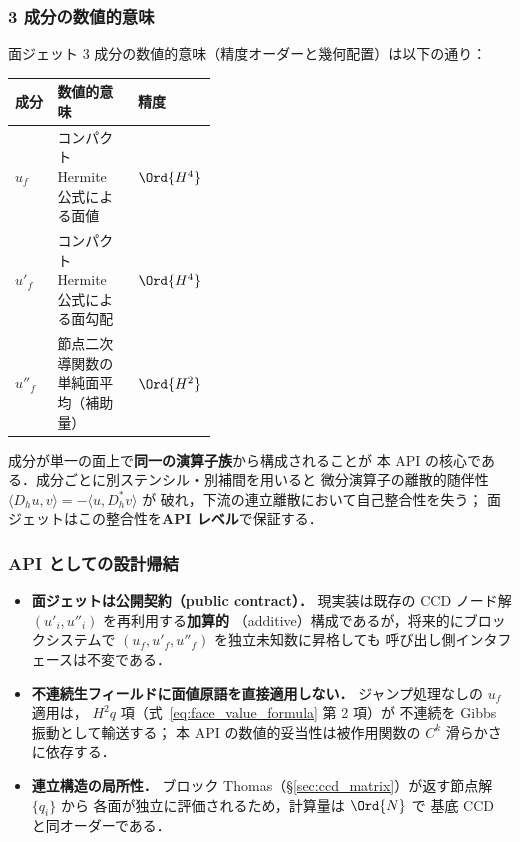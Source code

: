 \subsubsection{3 成分の数値的意味}
\label{sec:face_jet_roles}

面ジェット 3 成分の数値的意味（精度オーダーと幾何配置）は以下の通り：

\begin{center}
\begin{tabular}{l p{0.40\linewidth} l}
\hline
\textbf{成分} & \textbf{数値的意味} & \textbf{精度} \\ \hline
$u_f$    & コンパクト Hermite 公式による面値        & $\Ord{H^4}$ \\
$u'_f$   & コンパクト Hermite 公式による面勾配       & $\Ord{H^4}$ \\
$u''_f$  & 節点二次導関数の単純面平均（補助量）        & $\Ord{H^2}$ \\
\hline
\end{tabular}
\end{center}

 成分が単一の面上で\textbf{同一の演算子族}から構成されることが
本 API の核心である．成分ごとに別ステンシル・別補間を用いると
微分演算子の離散的随伴性 $\langle D_h u, v\rangle = -\langle u, D_h^{*} v\rangle$ が
破れ，下流の連立離散において自己整合性を失う；
面ジェットはこの整合性を\textbf{API レベル}で保証する．

\subsubsection{API としての設計帰結}
\label{sec:face_jet_design_consequences}

\begin{itemize}
  \item \textbf{面ジェットは公開契約（public contract）．}
        現実装は既存の CCD ノード解 $(u'_i, u''_i)$ を再利用する\textbf{加算的}
        （additive）構成であるが，将来的にブロックシステムで
        $(u_f, u'_f, u''_f)$ を独立未知数に昇格しても
        呼び出し側インタフェースは不変である．
  \item \textbf{不連続生フィールドに面値原語を直接適用しない．}
        ジャンプ処理なしの $u_f$ 適用は，
        $H^2 q$ 項（式~\eqref{eq:face_value_formula} 第 2 項）が
        不連続を Gibbs 振動として輸送する；
        本 API の数値的妥当性は被作用関数の $C^k$ 滑らかさに依存する．
  \item \textbf{連立構造の局所性．}
        ブロック Thomas（§\ref{sec:ccd_matrix}）が返す節点解 $\{q_i\}$ から
        各面が独立に評価されるため，計算量は $\Ord{N}$ で
        基底 CCD と同オーダーである．
\end{itemize}

